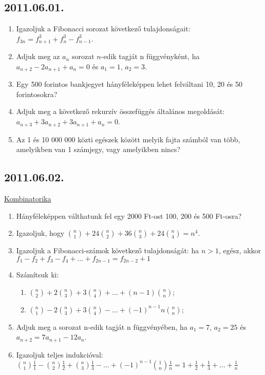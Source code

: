 \documentclass{article}
\begin{document}
\subsection*{2011.06.01.}
\begin{enumerate}
\item Igazoljuk a Fibonacci sorozat következő tulajdonságait: $f_{3n}=f_{n+1}^3+f_n^3-f_{n-1}^3$.
\item Adjuk meg az $a_n$ sorozat $n$-edik tagját n függvényként, ha $a_{n+2}-2a_{n+1}+a_n=0$ és $a_1=1$, $a_2=3$.
\item Egy 500 forintos bankjegyet hányféleképpen lehet felváltani 10, 20 és 50 forintosokra?
\item Adjuk meg a következő rekurzív összefüggés általános megoldását: $a_{n+3}+3a_{n+2}+3a_{n+1}+a_n=0$.
\item Az 1 és 10 000 000 közti egészek között melyik fajta számból van több, amelyikben van 1 számjegy, vagy amelyikben nincs?
\end{enumerate}

\subsection*{2011.06.02.}
\underline{Kombinatorika}
\begin{enumerate}
\item Hányféleképpen válthatunk fel egy 2000 Ft-ost 100, 200 és 500 Ft-osra?
\item Igazoljuk, hogy $\binom n1+24\binom n2+36\binom n3+24\binom n4=n^4$.
\item Igazoljuk a Fibonacci-számok következő tulajdonságát: ha $n>1$, egész, akkor
\\$f_1-f_2+f_3-f_4+\ldots+f_{2n-1}=f_{2n-2}+1$
\item Számítsuk ki:
\begin{enumerate}
\item $\binom n2+2\binom n3+3\binom n4+\ldots+(n-1)\binom nn$;
\item $\binom n1-2\binom n3+3\binom n4-\ldots+(-1)^{n-1}n\binom nn$;
\end{enumerate}
 \item Adjuk meg a sorozat n-edik tagját n függvényében, ha $a_1=7$, $a_2=25$ és $a_{n+2}=7a_{n+1}-12a_n$.
\item Igazoljuk teljes indukcióval:
$\binom n1\frac{1}{1}-\binom n2\frac{1}{2}+\binom n3\frac{1}{3}-\ldots+(-1)^{n-1}\binom 1n\frac{1}{n}=1+\frac{1}{2}+\frac{1}{3}+\ldots+\frac{1}{n}$
\end{enumerate}
\end{document}
